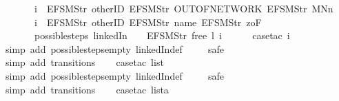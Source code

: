 \begin{isabellebody}
\ \ \ \ \ \ \ i\ {\isasymnoteq}\ {\isacharbrackleft}EFSM{\isachardot}Str\ {\isacharprime}{\isacharprime}otherID{\isacharprime}{\isacharprime}{\isacharcomma}\ EFSM{\isachardot}Str\ {\isacharprime}{\isacharprime}OUT{\isacharunderscore}OF{\isacharunderscore}NETWORK{\isacharprime}{\isacharprime}{\isacharcomma}\ EFSM{\isachardot}Str\ {\isacharprime}{\isacharprime}MNn{}{\isacharprime}{\isacharprime}{\isacharbrackright}\ {\isasymLongrightarrow}\isanewline
\ \ \ \ \ \ \ i\ {\isasymnoteq}\ {\isacharbrackleft}EFSM{\isachardot}Str\ {\isacharprime}{\isacharprime}otherID{\isacharprime}{\isacharprime}{\isacharcomma}\ EFSM{\isachardot}Str\ {\isacharprime}{\isacharprime}name{\isacharprime}{\isacharprime}{\isacharcomma}\ EFSM{\isachardot}Str\ {\isacharprime}{\isacharprime}{}zoF{\isacharprime}{\isacharprime}{\isacharbrackright}\ {\isasymLongrightarrow}\isanewline
\ \ \ \ \ \ \ possible{\isacharunderscore}steps\ linkedIn\ {}\ {\isacharless}{}\ {\isacharcolon}{\isacharequal}\ EFSM{\isachardot}Str\ {\isacharprime}{\isacharprime}free{\isacharprime}{\isacharprime}{\isachargreater}\ l\ i\ {\isacharequal}\ {\isacharbraceleft}{\isacharbar}{\isacharbar}{\isacharbraceright}{\isachardoublequoteclose}\isanewline
%
\isadelimproof
\ \ %
\endisadelimproof
%
\isatagproof
{}\isamarkupfalse%
\ {\isacharparenleft}case{\isacharunderscore}tac\ i{\isacharparenright}\isanewline
\ \ \ \isamarkupfalse%
\ {\isacharparenleft}simp\ add{\isacharcolon}\ possible{\isacharunderscore}steps{\isacharunderscore}empty\ linkedIn{\isacharunderscore}def{\isacharparenright}\isanewline
\ \ \ \isamarkupfalse%
\ safe{\isacharbrackleft}{}{\isacharbrackright}\isanewline
\ \ \ \ \ \ \isamarkupfalse%
\ {\isacharparenleft}simp\ add{\isacharcolon}\ transitions{\isacharparenright}{\isacharplus}\isanewline
\ \ \isamarkupfalse%
\ {\isacharparenleft}case{\isacharunderscore}tac\ list{\isacharparenright}\isanewline
\ \ \ \isamarkupfalse%
\ {\isacharparenleft}simp\ add{\isacharcolon}\ possible{\isacharunderscore}steps{\isacharunderscore}empty\ linkedIn{\isacharunderscore}def{\isacharparenright}\isanewline
\ \ \ \isamarkupfalse%
\ safe{\isacharbrackleft}{}{\isacharbrackright}\isanewline
\ \ \ \ \ \ \isamarkupfalse%
\ {\isacharparenleft}simp\ add{\isacharcolon}\ transitions{\isacharparenright}{\isacharplus}\isanewline
\ \ \isamarkupfalse%
\ {\isacharparenleft}case{\isacharunderscore}tac\ lista{\isacharparenright}\isanewline

\end{isabellebody}

